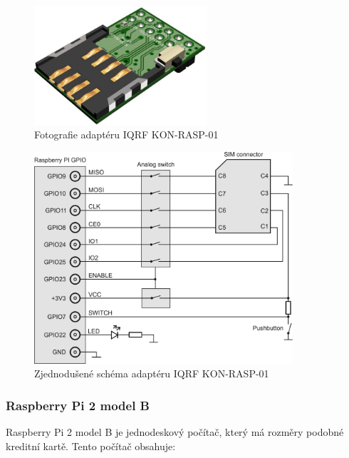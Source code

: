 \documentclass[12pt,a4paper,oneside]{article}
\begin{document}
\begin{figure}[H]
\centering
\label{fig:iqrf/fotka-kon-rasp-01}
\includegraphics[width = 64mm]{../img/iqrf/kon-rasp-01.png}
\caption{Fotografie adaptéru IQRF KON-RASP-01}
\end{figure}

\begin{figure}[H]
\centering
\label{fig:iqrf/zjednodusene-schema-kon-rasp-01}
\includegraphics[width = 96mm]{../img/iqrf/kon-rasp-01-zjednodusene-schema.png}
\caption{Zjednodušené schéma adaptéru IQRF KON-RASP-01}
\end{figure}

\subsubsection{Raspberry Pi 2 model B}

Raspberry Pi 2 model B je jednodeskový počítač, který má rozměry podobné kreditní kartě. Tento počítač obsahuje:
\end{document}
